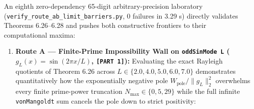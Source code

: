 \documentclass[
  11pt,
]{article}
\begin{document}
An eighth zero-dependency 65-digit arbitrary-precision laboratory
(\texttt{verify\_route\_ab\_limit\_barriers.py}, 0 failures in 3.29 s)
directly validates Theorems 6.26--6.28 and pushes both constructive
frontiers to their computational maxima:

\begin{enumerate}
\def\labelenumi{\arabic{enumi}.}
\item
  \textbf{Route A --- Finite-Prime Impossibility Wall on
  \texttt{oddSinMode\ L} (\(g_L(x) = \sin(2\pi x / L)\),
  \texttt{{[}PART\ 1{]}}):} Evaluating the exact Rayleigh quotients of
  Theorem 6.26 across \(L \in \{2.0, 4.0, 5.0, 6.0, 7.0\}\) demonstrates
  quantitatively how the exponentially negative pole
  \(W_{\text{pole}}/\|g_L\|_2^2\) overwhelms every finite prime-power
  truncation \(N_{\max} \in \{0, 5, 29\}\) while the full infinite
  \texttt{vonMangoldt} sum cancels the pole down to strict positivity:


\end{enumerate}
\end{document}
